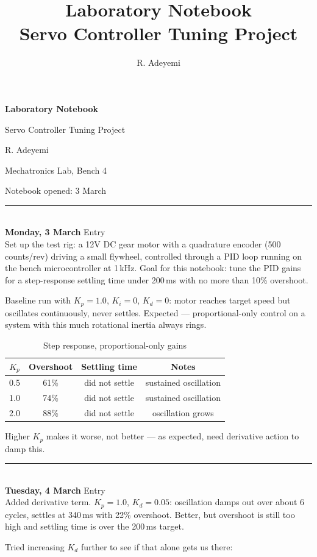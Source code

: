 \documentclass[11pt,a4paper]{article}
\title{Laboratory Notebook \\ \large Servo Controller Tuning Project}
\author{R. Adeyemi}
\date{}
\newcounter{entrynum}
\newcommand{\entry}[1]{%
  \stepcounter{entrynum}%
  \par\noindent\rule{\linewidth}{0.6pt}\\[2pt]
  {\bfseries\large #1} \hfill {\small Entry \theentrynum}\\[4pt]
}
\begin{document}
\begin{titlepage}
\centering
\vspace*{3cm}
{\Huge\bfseries Laboratory Notebook\par}
\vspace{0.5cm}
{\Large Servo Controller Tuning Project\par}
\vspace{2cm}
{\large R. Adeyemi\par}
{\large Mechatronics Lab, Bench 4\par}
\vfill
{\large Notebook opened: 3 March\par}
\end{titlepage}

\entry{Monday, 3 March}

Set up the test rig: a 12V DC gear motor with a quadrature encoder
(500 counts/rev) driving a small flywheel, controlled through a PID
loop running on the bench microcontroller at 1\,kHz. Goal for this
notebook: tune the PID gains for a step-response settling time under
200\,ms with no more than 10\% overshoot.

Baseline run with $K_p = 1.0$, $K_i = 0$, $K_d = 0$: motor reaches
target speed but oscillates continuously, never settles. Expected ---
proportional-only control on a system with this much rotational
inertia always rings.

\begin{table}[h]
\centering
\caption{Step response, proportional-only gains}
\begin{tabular}{cccc}
\toprule
$K_p$ & Overshoot & Settling time & Notes \\
\midrule
0.5 & 61\% & did not settle & sustained oscillation \\
1.0 & 74\% & did not settle & sustained oscillation \\
2.0 & 88\% & did not settle & oscillation grows \\
\bottomrule
\end{tabular}
\end{table}

Higher $K_p$ makes it worse, not better --- as expected, need
derivative action to damp this.

\entry{Tuesday, 4 March}

Added derivative term. $K_p = 1.0$, $K_d = 0.05$: oscillation damps
out over about 6 cycles, settles at 340\,ms with 22\% overshoot.
Better, but overshoot is still too high and settling time is over the
200\,ms target.

Tried increasing $K_d$ further to see if that alone gets us there:
\end{document}
